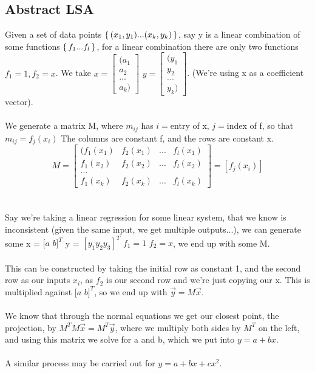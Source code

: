 \documentclass[10pt, twocolumn]{report}
\begin{document}
\subsection{Abstract LSA}
Given a set of data points $\set{(x_1, y_1) ... (x_k, y_k)}$, say y is a linear combination of some functions $\set{f_1 ... f_l}$, for a linear combination there are only two functions $f_1 = 1, f_2 = x$. We take $x = \begin{bmatrix}(a_1 \\ a_2 \\...\\a_k)\end{bmatrix}$ $y= \begin{bmatrix}(y_1 \\ y_2 \\...\\y_k)\end{bmatrix}$. (We're using x as a coefficient vector).\\\\ We generate a matrix M, where $m_{ij}$ has $i = $entry of x, $j = $index of f, so that $m_{ij} = f_j(x_i)$
The columns are constant f, and the rows are constant x. $$ M = \begin{bmatrix}(f_1(x_1) & f_2(x_1) & ... & f_l(x_1)\\ f_1(x_2) & f_2(x_2) & ... & f_l(x_2)\\...\\ f_1(x_k) & f_2(x_k) & ... & f_l(x_k)\end{bmatrix} = [f_j(x_i)]$$ \\\\ Say we're taking a linear regression for some linear system, that we know is inconsistent (given the same input, we get multiple outputs...), we can generate some x = $[a $ $ b]^T$ y = $[y_1 y_2 y_3]^T$ $f_1 = 1$ $f_2 = x$, we end up with some M. \\\\ This can be constructed by taking the initial row as constant 1, and the second row as our inputs $x_i$, as $f_2$ is our second row and we're just copying our x. This is multiplied against $[a $ $b]^T$, so we end up with $\vec y = M\vec x$. \\\\
We know that through the normal equations we get our closest point, the projection, by $M^TM\vec x = M^T\vec y$, where we multiply both sides by $M^T$ on the left, and using this matrix we solve for a and b, which we put into $y = a + bx$. \\\\ A similar process may be carried out for $y = a + bx + cx^2$.
\end{document}
